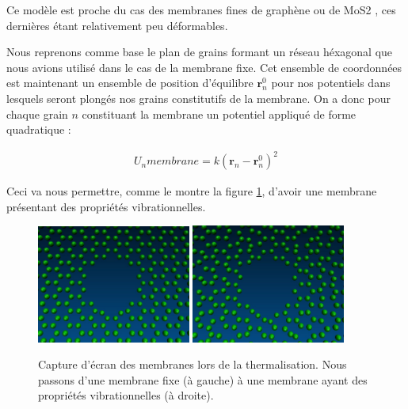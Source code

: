 Ce modèle est proche du cas des membranes fines de graphène \cite{Schneider2010} ou de MoS2 \cite{Feng2015,2Feng2015}, ces dernières étant relativement peu déformables.

Nous reprenons comme base le plan de grains formant un réseau héxagonal que nous avions utilisé dans le cas de la membrane fixe. Cet ensemble de coordonnées est maintenant un ensemble de position d'équilibre $\textbf{r}_n^{0}$ pour nos potentiels dans lesquels seront plongés nos grains constitutifs de la membrane. On a donc pour chaque grain $n$ constituant la membrane un potentiel appliqué de forme quadratique \cite{serway2004physics}:

\begin{center}
\begin{eqnarray}
U_{n}membrane=k(\textbf{r}_n-\textbf{r}_n^{0})^2
\end{eqnarray}
\end{center}
Ceci va nous permettre, comme le montre la figure \ref{2membranes}, d'avoir une membrane présentant des propriétés vibrationnelles.


\begin{figure}[H]
\begin{center}
\includegraphics[width=0.45\textwidth]{reseaufix.jpg} \hspace{0.04\textwidth}\includegraphics[width=0.45\textwidth]{reseauvib.jpg}

\caption[vibrations de la membrane]{Capture d'écran des membranes lors de la thermalisation. Nous passons d'une membrane fixe (à gauche) à une membrane ayant des propriétés vibrationnelles (à droite).}
\label{2membranes}
\end{center}
\end{figure}

